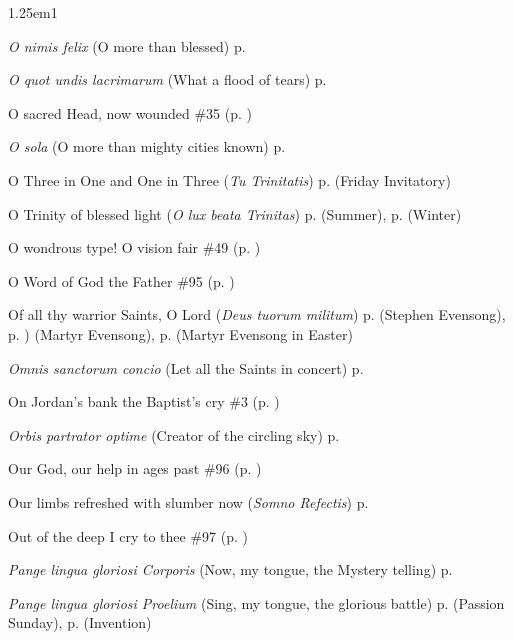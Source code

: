 \begin{hangparas}{1.25em}{1}
\par\noindent
\textit{O nimis felix} (O more than blessed) \dotfill p. \pageref{JohnBaptistMattins}
\par\noindent
\textit{O quot undis lacrimarum} (What a flood of tears) \dotfill p. \pageref{SevenSorrowsInvitatory}
\par\noindent
O sacred Head, now wounded  \dotfill \#35 (p. \pageref{Hymn35})
\par\noindent
\textit{O sola} (O more than mighty cities known) \dotfill p. \pageref{EpiphanyMattinsHymn}
\par\noindent
O Three in One and One in Three (\textit{Tu Trinitatis}) \dotfill p. \pageref{FridayInvitatory} (Friday Invitatory)
\par\noindent
O Trinity of blessed light (\textit{O lux beata Trinitas}) \dotfill p. \pageref{SaturdayEvensongSummer} (Summer), p. \pageref{SaturdayEvensongWinter} (Winter)
\par\noindent
O wondrous type! O vision fair \dotfill \#49 (p. \pageref{Hymn49})
\par\noindent
O Word of God the Father \dotfill \#95 (p. \pageref{Hymn95})
\par\noindent
Of all thy warrior Saints, O Lord (\textit{Deus tuorum militum}) \dotfill p. \pageref{StephenEvensong} (Stephen Evensong), p. \pageref{MartyrEvensong}) (Martyr Evensong), p. \pageref{MartyrEvensongEaster} (Martyr Evensong in Easter)
\par\noindent
\textit{Omnis sanctorum concio} (Let all the Saints in concert) \dotfill p. \pageref{AnneIIEvensong}
\par\noindent
On Jordan's bank the Baptist's cry \dotfill \#3 (p. \pageref{Hymn3})
\par\noindent
\textit{Orbis partrator optime} (Creator of the circling sky) \dotfill p. \pageref{GuardianAngelsMattins}
\par\noindent
Our God, our help in ages past \dotfill \#96 (p. \pageref{Hymn96})
\par\noindent
Our limbs refreshed with slumber now (\textit{Somno Refectis}) \dotfill p. \pageref{MondayInvitatory}
\par\noindent
Out of the deep I cry to thee \dotfill \#97 (p. \pageref{Hymn97})
\par\noindent
\textit{Pange lingua gloriosi Corporis} (Now, my tongue, the Mystery telling) \dotfill p. \pageref{CorpusChristiEvensong}
\par\noindent
\textit{Pange lingua gloriosi Proelium} (Sing, my tongue, the glorious battle) \dotfill p. \pageref{PassionInvitatoryHymn} (Passion Sunday), p. \pageref{InventionInvitatory} (Invention)

\end{hangparas}
